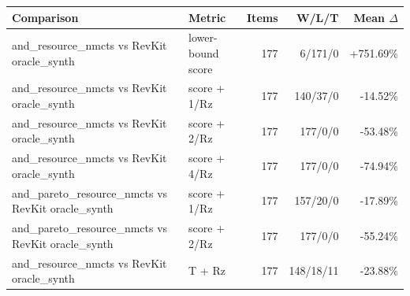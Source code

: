 \begin{tabular}{llrrr}
\toprule
Comparison & Metric & Items & W/L/T & Mean $\Delta$ \\
\midrule
and\_resource\_nmcts vs RevKit oracle\_synth & lower-bound score & 177 & 6/171/0 & +751.69\% \\
and\_resource\_nmcts vs RevKit oracle\_synth & score + 1/Rz & 177 & 140/37/0 & -14.52\% \\
and\_resource\_nmcts vs RevKit oracle\_synth & score + 2/Rz & 177 & 177/0/0 & -53.48\% \\
and\_resource\_nmcts vs RevKit oracle\_synth & score + 4/Rz & 177 & 177/0/0 & -74.94\% \\
and\_pareto\_resource\_nmcts vs RevKit oracle\_synth & score + 1/Rz & 177 & 157/20/0 & -17.89\% \\
and\_pareto\_resource\_nmcts vs RevKit oracle\_synth & score + 2/Rz & 177 & 177/0/0 & -55.24\% \\
and\_resource\_nmcts vs RevKit oracle\_synth & T + Rz & 177 & 148/18/11 & -23.88\% \\
\bottomrule
\end{tabular}
